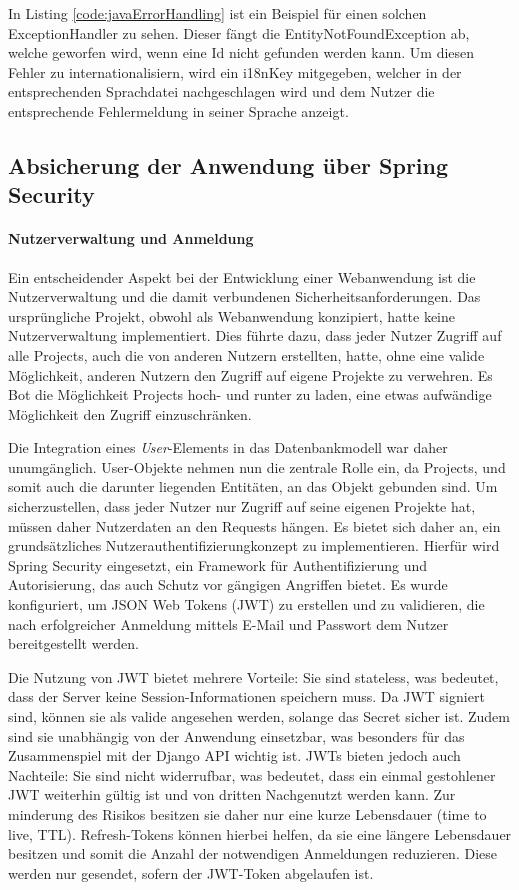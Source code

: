 In Listing \ref{code:javaErrorHandling} ist ein Beispiel für einen solchen ExceptionHandler zu sehen. Dieser fängt die EntityNotFoundException ab, welche geworfen wird, wenn eine Id nicht gefunden werden kann.
Um diesen Fehler zu internationalisiern, wird ein i18nKey mitgegeben, welcher in der entsprechenden Sprachdatei nachgeschlagen wird und dem Nutzer die entsprechende Fehlermeldung in seiner Sprache anzeigt.



\subsection{Absicherung der Anwendung über Spring Security}
\paragraph{Nutzerverwaltung und Anmeldung}
Ein entscheidender Aspekt bei der Entwicklung einer Webanwendung ist die Nutzerverwaltung und die damit verbundenen Sicherheitsanforderungen. Das ursprüngliche Projekt, obwohl als Webanwendung konzipiert, hatte keine Nutzerverwaltung implementiert. 
Dies führte dazu, dass jeder Nutzer Zugriff auf alle Projects, auch die von anderen Nutzern erstellten, hatte, ohne eine valide Möglichkeit, anderen Nutzern den Zugriff auf eigene Projekte zu verwehren.
Es Bot die Möglichkeit Projects hoch- und runter zu laden, eine etwas aufwändige Möglichkeit den Zugriff einzuschränken.

Die Integration eines \textit{User}-Elements in das Datenbankmodell war daher unumgänglich. User-Objekte nehmen nun die zentrale Rolle ein, da Projects, und somit auch die darunter liegenden Entitäten, an das Objekt gebunden sind. 
Um sicherzustellen, dass jeder Nutzer nur Zugriff auf seine eigenen Projekte hat, müssen daher Nutzerdaten an den Requests hängen. Es bietet sich daher an, ein grundsätzliches Nutzerauthentifizierungkonzept zu implementieren.
Hierfür wird Spring Security eingesetzt, ein Framework für Authentifizierung und Autorisierung, das auch Schutz vor gängigen Angriffen bietet. Es wurde konfiguriert, um JSON Web Tokens (JWT) zu erstellen und zu validieren, 
die nach erfolgreicher Anmeldung mittels E-Mail und Passwort dem Nutzer bereitgestellt werden.

Die Nutzung von JWT bietet mehrere Vorteile: Sie sind stateless, was bedeutet, dass der Server keine Session-Informationen speichern muss. Da JWT signiert sind, können sie als valide angesehen werden, solange das Secret sicher ist. Zudem sind sie unabhängig von der 
Anwendung einsetzbar, was besonders für das Zusammenspiel mit der Django API wichtig ist.
JWTs bieten jedoch auch Nachteile: Sie sind nicht widerrufbar, was bedeutet, dass ein einmal gestohlener JWT weiterhin gültig ist und von dritten Nachgenutzt werden kann. 
Zur minderung des Risikos besitzen sie daher nur eine kurze Lebensdauer (time to live, TTL).
Refresh-Tokens können hierbei helfen, da sie eine längere Lebensdauer besitzen und somit die Anzahl der notwendigen Anmeldungen reduzieren. Diese werden nur gesendet, sofern der JWT-Token abgelaufen ist.

